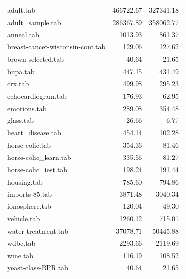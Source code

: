 \documentclass[10pt,a4paper]{article}
\begin{document}
\begin{tabular}{ l r r }
adult.tab & 466722.67 & 327341.18 \\
adult\_sample.tab & 286367.89 & 358062.77 \\
anneal.tab & 1013.93 & 861.37 \\
breast-cancer-wisconsin-cont.tab & 129.06 & 127.62 \\
brown-selected.tab & 40.64 & 21.65 \\
bupa.tab & 447.15 & 431.49 \\
crx.tab & 499.98 & 295.23 \\
echocardiogram.tab & 176.93 & 62.95 \\
emotions.tab & 289.08 & 354.48 \\
glass.tab & 26.66 & 6.77 \\
heart\_disease.tab & 454.14 & 102.28 \\
horse-colic.tab & 354.36 & 81.46 \\
horse-colic\_learn.tab & 335.56 & 81.27 \\
horse-colic\_test.tab & 198.24 & 191.44 \\
housing.tab & 785.60 & 794.86 \\
imports-85.tab & 3871.48 & 3040.34 \\
ionosphere.tab & 120.04 & 49.30 \\
vehicle.tab & 1260.12 & 715.01 \\
water-treatment.tab & 37078.71 & 50445.88 \\
wdbc.tab & 2293.66 & 2119.69 \\
wine.tab & 116.19 & 108.52 \\
yeast-class-RPR.tab & 40.64 & 21.65 \\
\end{tabular}
\end{document}
